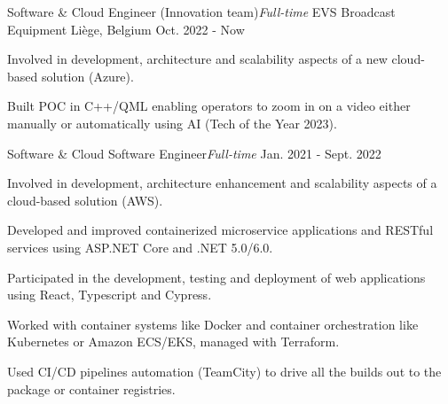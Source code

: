
\begin{cventries}

  \cventry
    {Software \& Cloud Engineer (Innovation team){\enskip\cdotp\enskip}\it{Full-time}} %
    {EVS Broadcast Equipment} %
    {Liège, Belgium} %
    {Oct. 2022 - Now} %
    {
      \begin{cvitems} %
        \item{Involved in development, architecture and scalability aspects of a new cloud-based solution (Azure).}
        \item{Built POC in C++/QML enabling operators to zoom in on a video either manually or automatically using AI (Tech of the Year 2023).}
      \end{cvitems}
    }

  \cventry
    {Software \& Cloud Software Engineer{\enskip\cdotp\enskip}\it{Full-time}} %
    {} %
    {} %
    {Jan. 2021 - Sept. 2022} %
    {
      \begin{cvitems} %
        \item{Involved in development, architecture enhancement and scalability aspects of a cloud-based solution (AWS).}
        \item{Developed and improved containerized microservice applications and RESTful services using ASP.NET Core and .NET 5.0/6.0.}
        \item{Participated in the development, testing and deployment of web applications using React, Typescript and Cypress.}
        \item{Worked with container systems like Docker and container orchestration like Kubernetes or Amazon ECS/EKS, managed with Terraform.}
        \item{Used CI/CD pipelines automation (TeamCity) to drive all the builds out to the package or container registries.}
      \end{cvitems}
    }


\end{cventries}
